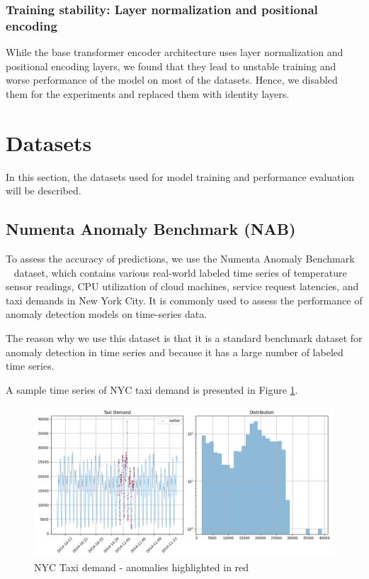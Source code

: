 \documentclass[a4paper, twoside]{report}
\theoremstyle{definition}
\numberwithin{equation}{section}
\begin{document}
\subsubsection{Training stability: Layer normalization and positional encoding}

While the base transformer encoder architecture uses layer normalization and positional encoding layers,
we found that they lead to unstable training and worse performance of the model on most
of the datasets. Hence, we disabled them for the experiments and replaced them with
identity layers.

\section{Datasets}

In this section, the datasets used for model training and performance evaluation will be described.

\subsection{Numenta Anomaly Benchmark (NAB)}
To assess the accuracy of predictions, we use the Numenta Anomaly Benchmark ~\cite{Ahmad2017Unsupervised} dataset,
which contains various real-world labeled time series of temperature sensor readings, CPU utilization of cloud machines, service
request latencies, and taxi demands in New York City. It is commonly used to assess the performance of anomaly detection
models on time-series data.

The reason why we use this dataset is that it is a standard benchmark dataset
for anomaly detection in time series and because it has a large number of labeled time series.

A sample time series of NYC taxi demand is presented in Figure \ref{fig:NAB_example_nyc_taxi}.
\begin{figure}[h!]
    \centering
    \includegraphics[scale=0.48]{NAB_example_nyc_taxi.png}
    \caption{NYC Taxi demand - anomalies highlighted in red}
    \label{fig:NAB_example_nyc_taxi}
\end{figure}
\end{document}
